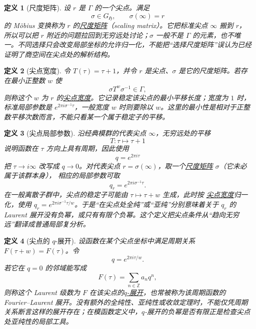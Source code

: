 \documentclass[UTF8,fontset=none,a4paper,11pt]{ctexart}
\theoremstyle{foundation-definition}
\newtheorem{definition}{定义}[section]
\theoremstyle{foundation-theorem}
\theoremstyle{foundation-proposition}
\theoremstyle{foundation-example}
\theoremstyle{foundation-remark}
\theoremstyle{foundation-theorem}
\newcommand{\term}[2]{\hyperref[#1]{#2}}
\begin{document}
\begin{definition}[尺度矩阵]\label{def:scaling-matrix}
设 \(r\) 是 \(\Gamma\) 的一个尖点。满足
\[
\sigma\in G_{\mathfrak H},\qquad \sigma(\infty)=r
\]
的 Möbius 变换称为 \(r\) 的\term{def:scaling-matrix}{尺度矩阵}（scaling matrix）。它把标准尖点 \(\infty\) 搬到 \(r\)，所以可以把 \(r\) 附近的问题拉回到无穷远处讨论；\(\sigma\) 一般不是 \(\Gamma\) 的元素，也不唯一。不同选择只会改变局部坐标的允许归一化，不能把“选择尺度矩阵”误认为已经证明了商空间在尖点处的解析结构。
\end{definition}

\begin{definition}[尖点宽度]\label{def:cusp-width}
令 \(T(\tau)=\tau+1\)，并令 \(r\) 是尖点、\(\sigma\) 是它的尺度矩阵。若存在最小正整数 \(w\) 使
\[
\sigma T^w\sigma^{-1}\in\Gamma,
\]
则称这个 \(w\) 为 \(r\) 的\term{def:cusp-width}{尖点宽度}。它记录稳定该尖点的最小平移长度；宽度为 \(1\) 时，标准局部参数是 \(e^{2\pi i\sigma^{-1}\tau}\)，一般宽度 \(w\) 时则要除以 \(w\)。这里的最小性是相对于正整数平移次数而言，不能只看某一个属于稳定子的平移。
\end{definition}

\begin{definition}[尖点局部参数]\label{def:cusp-local-parameter}
沿经典模群的代表尖点 \(\infty\)，无穷远处的平移
\[
T:\tau\longmapsto\tau+1
\]
说明函数在 \(\tau\) 方向上具有周期，因此使用
\[
q=e^{2\pi i\tau}
\]
把 \(\tau\to i\infty\) 改写成 \(q\to0\)。对代表尖点
\(r=\sigma(\infty)\)，取一个\term{def:scaling-matrix}{尺度矩阵}
\(\sigma\)（它未必属于该群本身），
相应的局部参数可取
\[
q_r=e^{2\pi i\sigma^{-1}\tau}.
\]
在一般离散子群中，尖点的稳定子可能由 \(\tau\mapsto\tau+w\) 生成，此时按
\term{def:cusp-width}{尖点宽度}归一化，使用
\(q_r=e^{2\pi i\sigma^{-1}\tau/w}\)。于是“在尖点处全纯”或“亚纯”分别意味着关于 \(q_r\) 的 Laurent 展开没有负幂，或只有有限个负幂。这个定义把尖点条件从“趋向无穷远”翻译成普通局部复分析。
\end{definition}

\begin{definition}[尖点的 \(q\)-展开]\label{def:q-expansion}
设函数在某个尖点坐标中满足周期关系 \(F(\tau+w)=F(\tau)\)。令
\[
q=e^{2\pi i\tau/w}.
\]
若它在 \(q=0\) 的邻域能写成
\[
F(\tau)=\sum_{n\in\mathbb Z}a_nq^n,
\]
则称这个 Laurent 级数为 \(F\) 在该尖点的\term{def:q-expansion}{\(q\)-展开}，也常被称为该周期函数的 Fourier--Laurent 展开。没有额外的全纯性、亚纯性或收敛定理时，不能仅凭周期关系断言这样的展开存在；在模函数定义中，\(q\)-展开的负幂是否有限正是检查尖点处亚纯性的局部工具。
\end{definition}
\end{document}
